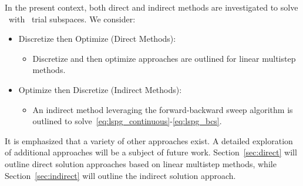 In the present context, both direct and indirect methods are investigated to solve \methodAcronym\ with \spatialAcronym\ trial subspaces. We consider: 

\begin{itemize} \item Discretize then Optimize (Direct Methods): 
\begin{itemize}
\item Discretize and then optimize approaches are outlined for linear multistep methods. 
\end{itemize} 
\item Optimize then Discretize (Indirect Methods): 
\begin{itemize} 
\item An indirect method leveraging the forward-backward sweep algorithm is outlined 
to solve~\eqref{eq:lspg_continuous}-\eqref{eq:lspg_bcs}. 
 \end{itemize} 
\end{itemize} 
It
is emphasized that a variety of other approaches exist. A detailed exploration
of additional approaches will be a subject of future work. Section~\ref{sec:direct} 
will outline direct solution approaches based on linear multistep methods, 
while Section~\ref{sec:indirect} will outline the indirect solution approach. 





